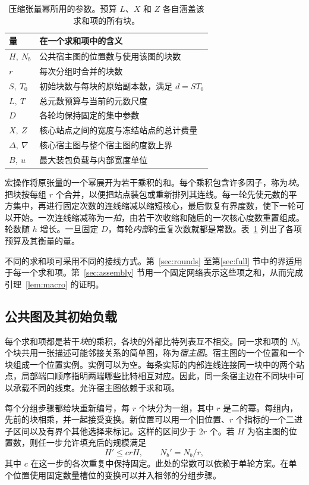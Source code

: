 \begin{table}[bp]\centering \small \begin{tabular}{@{}ll@{}} \toprule 量 & 在一个求和项中的含义\\ \midrule $H,\ N_b$ & 公共宿主图的位置数与使用该图的块数\\ $r$ & 每次分组时合并的块数\\ $S,\ T_0$ & 初始块数与每块的原始副本数，满足 $d=ST_0$\\ $L,\ T$ & 总元数预算与当前的元数尺度\\ $D$ & 各轮均保持固定的集中参数\\[2pt] $X,\ Z$ & 核心站点之间的宽度与冻结站点的总计费量\\ $\Delta,\ \nabla$ & 核心宿主图与整个宿主图的度数上界\\ $B,\ u$ & 最大装包负载与内部宽度单位\\ \bottomrule \end{tabular} \caption{压缩张量幂所用的参数。预算 $L$、$X$ 和 $Z$ 各自涵盖该求和项的所有块。}\label{tab:macro} \end{table}

宏操作将原张量的一个幂展开为若干乘积的和。每个乘积包含许多因子，称为\emph{块}。把块按每组 $r$ 个合并，以便把站点装包或重新排列其连线。每一轮先使元数的平方集中，再进行固定次数的连线缩减以缩短核心，最后恢复有界度数，使下一轮可以开始。一次连线缩减称为一\emph{拍}，由若干次收缩和随后的一次核心度数重置组成。轮数随 $h$ 增长。一旦固定 $D$，每轮\emph{内部}的重复次数就都是常数。表~\ref{tab:macro} 列出了各项预算及其衡量的量。

不同的求和项可采用不同的接线方式。第~\ref{sec:rounds} 至第\ref{sec:full} 节中的界适用于每一个求和项。第~\ref{sec:assembly} 节用一个固定网络表示这些项之和，从而完成引理~\ref{lem:macro} 的证明。

\subsection{公共图及其初始负载} 每个求和项都是若干\emph{块}的乘积，各块的外部比特列表互不相交。同一求和项的 $N_b$ 个块共用一张描述可能邻接关系的简单图，称为\emph{宿主图}。宿主图的一个位置和一个块组成一个位置实例。实例可以为空。每条实际的内部连线连接同一块中的两个站点，局部端口顺序指明两端哪些比特相互对应。因此，同一条宿主边在不同块中可以承载不同的线束。允许宿主图依赖于求和项。

每个分组步骤都给块重新编号，每 $r$ 个块分为一组，其中 $r$ 是二的幂。每组内，先前的块相乘，并一起接受变换。新位置可以用一个旧位置、$r$ 个指标的一个二进子区间以及有界个其他选择来标记。这样的区间少于 $2r$ 个。若 $H$ 为宿主图的位置数，则任一步允许填充后的规模满足 \begin{equation}\label{eq:round-occurrence}
 H'\le c rH, \qquad N_b'=N_b/r,
\end{equation} 其中 $c$ 在这一步的各次重复中保持固定。此处的常数可以依赖于单轮方案。在单个位置使用固定数量槽位的变换可以并入相邻的分组步骤。

